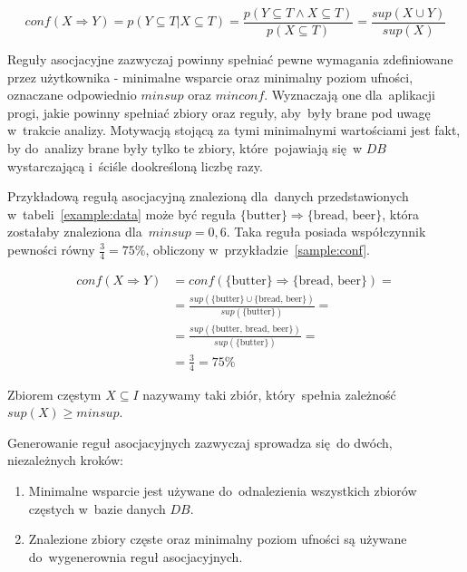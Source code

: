 \begin{equation}\label{confidence:def2}
	conf(X \Rightarrow Y) = p(Y \subseteq T | X\subseteq T) = \frac{p(Y \subseteq T \land X\subseteq T)}{p(X\subseteq T)} =\frac{sup(X \cup Y)}{sup(X)}
\end{equation}

Reguły asocjacyjne zazwyczaj powinny spełniać pewne wymagania zdefiniowane przez użytkownika - minimalne wsparcie oraz minimalny poziom ufności, oznaczane odpowiednio $minsup$ oraz $minconf$. Wyznaczają one dla~aplikacji progi, jakie powinny spełniać zbiory oraz reguły, aby~były brane pod uwagę w~trakcie analizy. Motywacją stojącą za tymi minimalnymi wartościami jest fakt, by do~analizy brane były tylko te zbiory, które~pojawiają się~w $DB$ wystarczającą i~ściśle dookreśloną liczbę razy.

Przykładową regułą asocjacyjną znalezioną dla~danych przedstawionych w~tabeli~\ref{example:data} może być reguła $\lbrace \textrm{butter} \rbrace \Rightarrow \lbrace \textrm{bread, beer} \rbrace$, która zostałaby znaleziona dla~$minsup = 0,6$. Taka reguła posiada współczynnik pewności równy $\frac{3}{4}=75\%$, obliczony w~przykładzie~\ref{sample:conf}.

\begin{equation}\label{sample:conf}
\begin{split}
conf(X \Rightarrow Y)& = conf(\lbrace \textrm{butter} \rbrace \Rightarrow \lbrace \textrm{bread, beer} \rbrace) =\\
& = \frac{sup(\lbrace \textrm{butter} \rbrace \cup \lbrace \textrm{bread, beer} \rbrace)}{sup(\lbrace \textrm{butter} \rbrace)} =\\
& = \frac{sup(\lbrace \textrm{butter, bread, beer} \rbrace)}{sup(\lbrace \textrm{butter} \rbrace)} =\\
& = \frac{3}{4} = 75\%
\end{split}
\end{equation}

\begin{df}
Zbiorem częstym $X \subseteq I$ nazywamy taki zbiór, który~spełnia zależność $sup(X) \geq minsup$.
\end{df}

Generowanie reguł asocjacyjnych zazwyczaj sprowadza się~do dwóch, niezależnych kroków:
\begin{enumerate}
	\item Minimalne wsparcie jest używane do~odnalezienia wszystkich zbiorów częstych w~bazie danych $DB$.
	\item Znalezione zbiory częste oraz minimalny poziom ufności są używane do~wygenerownia reguł asocjacyjnych.
\end{enumerate}

